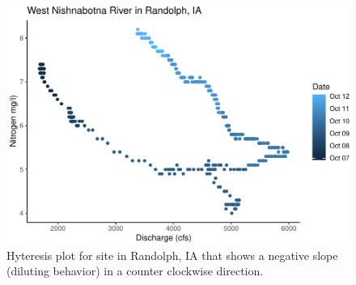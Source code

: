 \documentclass[12pt,]{article}
\begin{document}
\begin{figure}
\centering
\includegraphics{Missouri-Reasearch-Project---FINAL_files/figure-latex/Randolphstorm-1.pdf}
\caption{\label{fig:Randolphstorm}Hyteresis plot for site in Randolph,
IA that shows a negative slope (diluting behavior) in a counter
clockwise direction.}
\end{figure}
\end{document}
